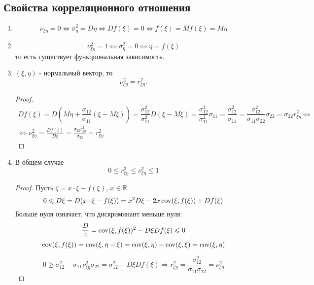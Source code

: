 \subsection{Свойства корреляционного отношения}
\begin{enumerate}
  \item 
    \[
      \nu_{\xi\eta} = 0 \Leftrightarrow \bar\sigma^2_\eta = D\eta \Leftrightarrow Df(\xi) = 0 \Leftrightarrow f(\xi) = Mf(\xi) = M\eta
    \]
  \item
    \[
    \nu_{\xi\eta}^2 = 1 \Leftrightarrow \bar\sigma_\eta^2 = 0 \Leftrightarrow \eta = f(\xi)
    \]
    то есть существует функциональная зависимость.

  \item $(\xi, \eta)$ - нормальный вектор, то 
    \[
      \nu_{\xi\eta}^2 = r_{\xi\eta}^2.
    \]
    \begin{proof}
      \begin{multline*}
        Df(\xi) = D\left(M\eta + \dfrac{\sigma_{12}}{\sigma_{11}} (\xi - M\xi)\right)
        = \dfrac{\sigma_{12}^2}{\sigma_{11}^2} D(\xi - M\xi)
        = \dfrac{\sigma_{12}^2}{\sigma_{11}^2} \sigma_{11}
        = \dfrac{\sigma_{12}^2}{\sigma_{11}}
        = \dfrac{\sigma_{12}^2}{\sigma_{11} \sigma_{22}} \sigma_{22}
        = \sigma_{22} r_{\xi\eta}^2
        \Leftrightarrow \\
        \Leftrightarrow
        \nu_{\xi\eta}^2 = \frac{Df(\xi)}{D\eta} = \frac{\sigma_{22} r_{\xi\eta}^2}{\sigma_{22}} = r_{\xi\eta}^2
      \end{multline*}
    \end{proof}

  \item В общем случае
    \[
      0 \leqslant r_{\xi\eta}^2 \leqslant \nu_{\xi\eta}^2 \leqslant 1
    \]
    \begin{proof}
      Пусть $\zeta = x \cdot \xi - f(\xi)$, $x\in\mathbb{R}$.
      \[
        0 \leqslant D\xi = D(x \cdot \xi - f(\xi)) = x^2 D\xi - 2 x \operatorname{cov} (\xi, f(\xi)) + D f(\xi)
      \]
      Больше нуля означает, что дискриминант меньше нуля:
      \[
        \frac{D}{4} = \operatorname{cov}(\xi, f(\xi))^2 - D\xi Df(\xi) \leqslant 0
      \]
      \[
        \operatorname{cov}(\xi, f(\xi)) = \operatorname{cov}(\xi, \eta - \xi)
        = \operatorname{cov}(\xi, \eta) - \operatorname{cov}(\xi, \xi) = \operatorname{cov}(\xi, \eta)
      \]

      \[
        0 \geqslant \sigma_{12}^2 - \sigma_{11} \nu_{\xi\eta}^2 \sigma_{22} = \sigma_{12}^2 - D\xi Df(\xi) \Rightarrow r_{\xi\eta}^2 = \frac{\sigma_{12}^2}{\sigma_{11} \sigma_{22}} = \nu_{\xi\eta}^2
      \]
    \end{proof}
\end{enumerate}

